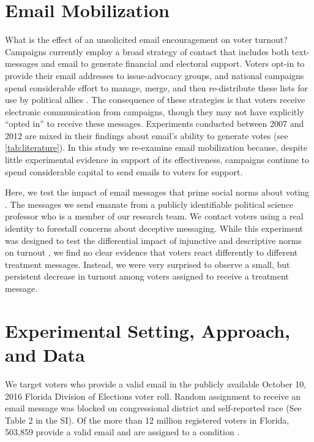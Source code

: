 \documentclass[12pt]{article}
\begin{document}
\clearpage

\setcounter{page}{1} \doublespacing

\section{Email Mobilization}

What is the effect of an unsolicited email encouragement on voter
turnout? Campaigns currently employ a broad strategy of contact that
includes both text-messages \citep{roose2018} and email
\citep{astor2019} to generate financial and electoral support. Voters
opt-in to provide their email addresses to issue-advocacy groups, and
national campaigns spend considerable effort to manage, merge, and
then re-distribute these lists for use by political allies
\citep{evers2019}. The consequence of these strategies is that voters
receive electronic communication from campaigns, though they may not
have explicitly “opted in” to receive these messages. Experiments
conducted between 2007 and 2012 are mixed in their findings about
email’s ability to generate votes (see \autoref{tab:literature}). In
this study we re-examine email mobilization because, despite little
experimental evidence in support of its effectiveness, campaigns
continue to spend considerable capital to send emails to voters for
support.

Here, we test the impact of email messages that prime social norms
about voting \citep{gerber2009}.  The messages we send emanate from a
publicly identifiable political science professor who is a member of
our research team. We contact voters using a real identity to
forestall concerns about deceptive messaging. While this experiment
was designed to test the differential impact of injunctive and
descriptive norms on turnout \citep{rivera2016}, we find no clear
evidence that voters react differently to different treatment
messages. Instead, we were very surprised to observe a small, but
persistent decrease in turnout among voters assigned to receive a
treatment message.



\section{Experimental Setting, Approach, and Data}

We target voters who provide a valid email in the publicly available
October 10, 2016 Florida Division of Elections voter roll. Random
assignment to receive an email message was blocked on congressional
district and self-reported race (See Table 2 in the SI). Of the more
than 12 million registered voters in Florida, 503,859 provide a valid
email and are assigned to a condition \citep{rivera2020}.
\end{document}
